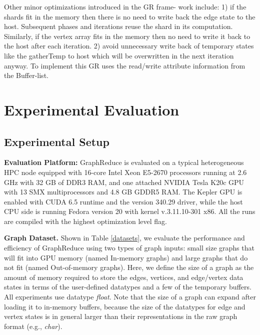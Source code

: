 Other minor optimizations introduced in the GR frame- work include: 1) if the shards fit in the memory then there is no need to write back the edge state to the host. Subsequent phases and iterations reuse the shard in its computation. Similarly, if the vertex array fits in the memory then no need to write it back to the host after each iteration. 2) avoid unnecessary write back of temporary states like the gatherTemp to host which will be overwritten in the next iteration anyway. To implement this GR uses the read/write attribute information from the Buffer-list. 

\section{Experimental Evaluation }
\label{experiment}

\subsection{Experimental Setup}

\textbf{Evaluation Platform:} GraphReduce is evaluated on a typical heterogeneous HPC node equipped with 16-core Intel Xeon E5-2670 processors running at 2.6 GHz with 32 GB of DDR3 RAM, and one attached NVIDIA Tesla K20c GPU with 13 SMX multiprocessors and 4.8 GB GDDR5 RAM. The Kepler GPU is enabled with CUDA 6.5 runtime and the version 340.29 driver, while the host CPU side is running Fedora version 20 with kernel v.3.11.10-301 x86. All the runs are compiled with the highest optimization level flag.  



\textbf{Graph Dataset.} Shown in Table \ref{datasets}, we evaluate the performance and efficiency of GraphReduce using two types of graph inputs: 
small size graphs that will fit into GPU memory (named In-memory graphs) and large graphs that do not fit (named Out-of-memory graphs). 
Here, we define the size of a graph as the amount of memory required to store the edges, vertices, and edge/vertex data states in terms of 
the user-defined datatypes and a few of the temporary buffers. All experiments use datatype \textit{float}. Note that the size of a graph 
can expand after loading it to in-memory buffers, because the size of the datatypes for edge and vertex states is in general larger than 
their representations in the raw graph format (e.g., \textit{char}). 


